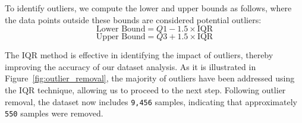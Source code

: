 To identify outliers, we compute the lower and upper bounds as follows, where the data points outside these bounds are considered potential outliers:
\begin{equation}
    \text{Lower Bound} = Q1 - 1.5 \times \text{IQR}
\end{equation}
\begin{equation}
    \text{Upper Bound} = Q3 + 1.5 \times \text{IQR}
\end{equation}

The IQR method is effective in identifying the impact of outliers, thereby improving the accuracy of our dataset analysis. As it is illustrated in Figure~\ref{fig:outlier_removal}, the majority of outliers have been addressed using the IQR technique, allowing us to proceed to the next step. Following outlier removal, the dataset now includes \texttt{9,456} samples, indicating that approximately \texttt{550} samples were removed.

